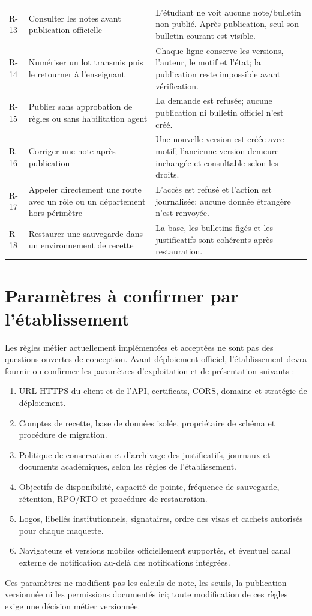 \documentclass[11pt,a4paper]{article}
\begin{document}
\begin{longtable}{L{1.5cm}L{6.0cm}L{7.8cm}}
R-13 & Consulter les notes avant publication officielle & L'étudiant ne voit aucune note/bulletin non publié. Après publication, seul son bulletin courant est visible. \\
R-14 & Numériser un lot transmis puis le retourner à l'enseignant & Chaque ligne conserve les versions, l'auteur, le motif et l'état; la publication reste impossible avant vérification. \\
R-15 & Publier sans approbation de règles ou sans habilitation agent & La demande est refusée; aucune publication ni bulletin officiel n'est créé. \\
R-16 & Corriger une note après publication & Une nouvelle version est créée avec motif; l'ancienne version demeure inchangée et consultable selon les droits. \\
R-17 & Appeler directement une route avec un rôle ou un département hors périmètre & L'accès est refusé et l'action est journalisée; aucune donnée étrangère n'est renvoyée. \\
R-18 & Restaurer une sauvegarde dans un environnement de recette & La base, les bulletins figés et les justificatifs sont cohérents après restauration. \\
\bottomrule
\end{longtable}

\section{Paramètres à confirmer par l’établissement}

Les règles métier actuellement implémentées et acceptées ne sont pas des questions ouvertes de conception. Avant déploiement officiel, l’établissement devra fournir ou confirmer les paramètres d’exploitation et de présentation suivants :
\begin{enumerate}
  \item URL HTTPS du client et de l’API, certificats, CORS, domaine et stratégie de déploiement.
  \item Comptes de recette, base de données isolée, propriétaire de schéma et procédure de migration.
  \item Politique de conservation et d’archivage des justificatifs, journaux et documents académiques, selon les règles de l’établissement.
  \item Objectifs de disponibilité, capacité de pointe, fréquence de sauvegarde, rétention, RPO/RTO et procédure de restauration.
  \item Logos, libellés institutionnels, signataires, ordre des visas et cachets autorisés pour chaque maquette.
  \item Navigateurs et versions mobiles officiellement supportés, et éventuel canal externe de notification au-delà des notifications intégrées.
\end{enumerate}
Ces paramètres ne modifient pas les calculs de note, les seuils, la publication versionnée ni les permissions documentés ici; toute modification de ces règles exige une décision métier versionnée.
\end{document}
